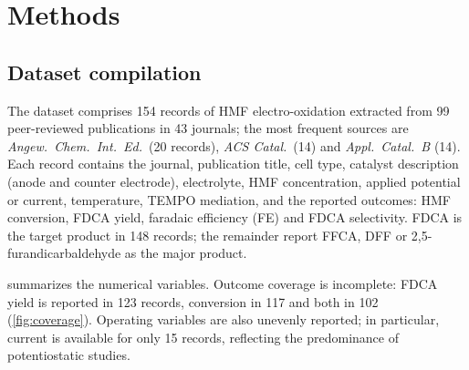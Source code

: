 \documentclass[10pt,a4paper]{article}
\begin{document}
\section{Methods}
\label{sec:methods}

\subsection{Dataset compilation}
\label{sec:data}

The dataset comprises 154 records of HMF electro-oxidation extracted from 99
peer-reviewed publications in 43 journals; the most frequent sources are
\emph{Angew.\ Chem.\ Int.\ Ed.}\ (20 records), \emph{ACS Catal.}\ (14) and
\emph{Appl.\ Catal.\ B} (14). Each record contains the journal, publication
title, cell type, catalyst description (anode and counter electrode), electrolyte,
HMF concentration, applied potential or current, temperature, TEMPO mediation,
and the reported outcomes: HMF conversion, FDCA yield, faradaic efficiency (FE)
and FDCA selectivity. FDCA is the target product in 148 records; the remainder
report FFCA, DFF or 2,5-furandicarbaldehyde as the major product.

 summarizes the numerical variables. Outcome coverage is
incomplete: FDCA yield is reported in 123 records, conversion in 117 and both
in 102 (\cref{fig:coverage}). Operating variables are also unevenly reported;
in particular, current is available for only 15 records, reflecting the
predominance of potentiostatic studies.
\end{document}

